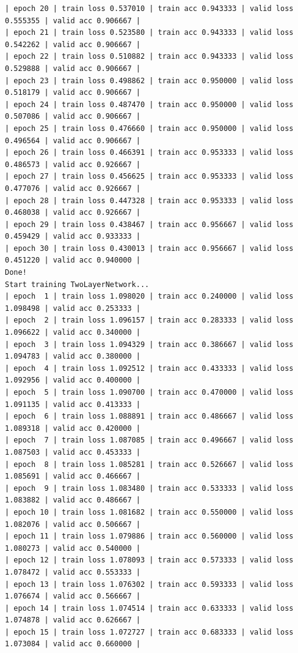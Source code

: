 \documentclass[10pt]{article}
\begin{document}
\begin{verbatim}
| epoch 20 | train loss 0.537010 | train acc 0.943333 | valid loss 0.555355 | valid acc 0.906667 |
| epoch 21 | train loss 0.523580 | train acc 0.943333 | valid loss 0.542262 | valid acc 0.906667 |
| epoch 22 | train loss 0.510882 | train acc 0.943333 | valid loss 0.529888 | valid acc 0.906667 |
| epoch 23 | train loss 0.498862 | train acc 0.950000 | valid loss 0.518179 | valid acc 0.906667 |
| epoch 24 | train loss 0.487470 | train acc 0.950000 | valid loss 0.507086 | valid acc 0.906667 |
| epoch 25 | train loss 0.476660 | train acc 0.950000 | valid loss 0.496564 | valid acc 0.906667 |
| epoch 26 | train loss 0.466391 | train acc 0.953333 | valid loss 0.486573 | valid acc 0.926667 |
| epoch 27 | train loss 0.456625 | train acc 0.953333 | valid loss 0.477076 | valid acc 0.926667 |
| epoch 28 | train loss 0.447328 | train acc 0.953333 | valid loss 0.468038 | valid acc 0.926667 |
| epoch 29 | train loss 0.438467 | train acc 0.956667 | valid loss 0.459429 | valid acc 0.933333 |
| epoch 30 | train loss 0.430013 | train acc 0.956667 | valid loss 0.451220 | valid acc 0.940000 |
Done!
Start training TwoLayerNetwork...
| epoch  1 | train loss 1.098020 | train acc 0.240000 | valid loss 1.098498 | valid acc 0.253333 |
| epoch  2 | train loss 1.096157 | train acc 0.283333 | valid loss 1.096622 | valid acc 0.340000 |
| epoch  3 | train loss 1.094329 | train acc 0.386667 | valid loss 1.094783 | valid acc 0.380000 |
| epoch  4 | train loss 1.092512 | train acc 0.433333 | valid loss 1.092956 | valid acc 0.400000 |
| epoch  5 | train loss 1.090700 | train acc 0.470000 | valid loss 1.091135 | valid acc 0.413333 |
| epoch  6 | train loss 1.088891 | train acc 0.486667 | valid loss 1.089318 | valid acc 0.420000 |
| epoch  7 | train loss 1.087085 | train acc 0.496667 | valid loss 1.087503 | valid acc 0.453333 |
| epoch  8 | train loss 1.085281 | train acc 0.526667 | valid loss 1.085691 | valid acc 0.466667 |
| epoch  9 | train loss 1.083480 | train acc 0.533333 | valid loss 1.083882 | valid acc 0.486667 |
| epoch 10 | train loss 1.081682 | train acc 0.550000 | valid loss 1.082076 | valid acc 0.506667 |
| epoch 11 | train loss 1.079886 | train acc 0.560000 | valid loss 1.080273 | valid acc 0.540000 |
| epoch 12 | train loss 1.078093 | train acc 0.573333 | valid loss 1.078472 | valid acc 0.553333 |
| epoch 13 | train loss 1.076302 | train acc 0.593333 | valid loss 1.076674 | valid acc 0.566667 |
| epoch 14 | train loss 1.074514 | train acc 0.633333 | valid loss 1.074878 | valid acc 0.626667 |
| epoch 15 | train loss 1.072727 | train acc 0.683333 | valid loss 1.073084 | valid acc 0.660000 |

\end{verbatim}
\end{document}

